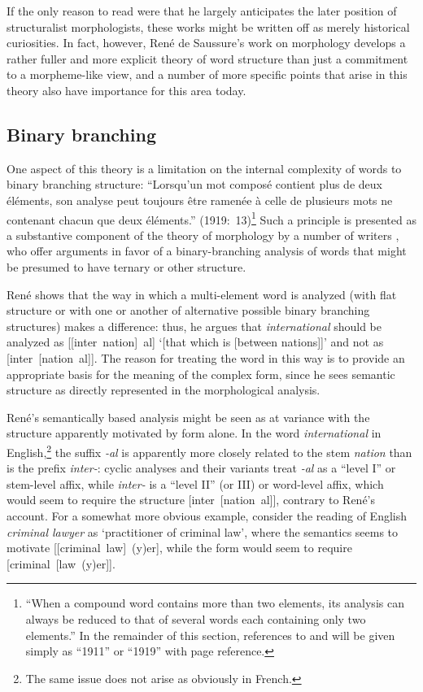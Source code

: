\documentclass[output=paper]{langsci/langscibook}
\begin{document}
If the only reason to read
\citet{r.desaussure11:formation,r.desaussure19:structure.logique} were
that he largely anticipates the later position of structuralist
morphologists, these works might be written off as merely historical
curiosities. In fact, however, Ren\'e de Saussure's work on morphology
develops a rather fuller and more explicit theory of word structure
than just a commitment to a morpheme-like view, and a number of more
specific points that arise in this theory also have importance for
this area today.

\subsection{Binary branching}
\label{sec:binary-branching}

One aspect of this theory is a limitation on the internal complexity
of words to binary branching structure: ``Lorsqu'un mot composé
contient plus de deux éléments, son analyse peut toujours être ramenée
à celle de plusieurs mots ne contenant chacun que deux éléments.''
(1919:~13)\footnote{``When a compound word contains more than two
  elements, its analysis can always be reduced to that of several
  words each containing only two elements.'' In the remainder of this
  section, references to \cite{r.desaussure11:formation} and
  \citet{r.desaussure19:structure.logique} will be given simply as
  ``1911'' or ``1919'' with page reference.} Such a principle is
presented as a substantive component of the theory of morphology by a
number of writers
\citep{aronoff:book,booij77:dutch-morphology,lieber:thesis,scalise:text},
who offer arguments in favor of a binary-branching analysis of words
that might be presumed to have ternary or other structure.

René shows that the way in which a multi-element word is analyzed
(with flat structure or with one or another of alternative possible
binary branching structures) makes a difference: thus, he argues that
\emph{international} should be analyzed as {[[inter~nation]~al]}
`[that which is [between nations]]' and not as
{[inter~[nation~al]]}. The reason for treating the word in this way is
to provide an appropriate basis for the meaning of the complex form,
since he sees semantic structure as directly represented in the
morphological analysis.

René's semantically based analysis might be seen as at variance with
the structure apparently motivated by form alone. In the word
\emph{international} in English,\footnote{The same issue does not
  arise as obviously in French.} the suffix \emph{-al} is apparently
more closely related to the stem \emph{nation} than is the prefix
\emph{inter-}: cyclic analyses and their variants treat \emph{-al} as
a ``level I'' or stem-level affix, while \emph{inter-} is a ``level
II'' (or III) or word-level affix, which would seem to require the
structure {[inter~[nation~al]]}, contrary to René's account.  For a
somewhat more obvious example, consider the reading of English
\emph{criminal lawyer} as `practitioner of criminal law', where the
semantics seems to motivate {[[criminal~law]~(y)er]}, while the form
would seem to require {[criminal~[law~(y)er]]}. 
\end{document}
